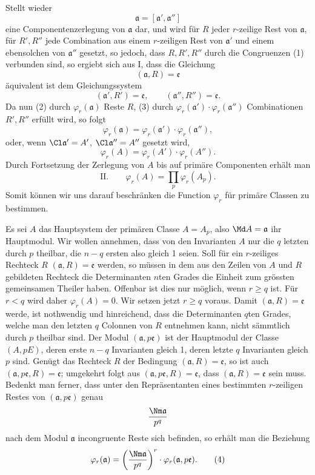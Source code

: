Stellt wieder
\[
 \mathfrak a=[\mathfrak a',\mathfrak a'']
\]
eine Componentenzerlegung von $\mathfrak a$ dar, und wird für $R$ jeder $r$-zeilige Rest von $\mathfrak a$, für $R',R''$ jede Combination aus einem $r$-zeiligen Rest von $\mathfrak a'$ und einem ebensolchen von $\mathfrak a''$ gesetzt, so jedoch, dass $R,R',R''$ durch die Congruenzen (1) verbunden sind, so ergiebt sich aus I, dass die Gleichung
\begin{equation}
 (\mathfrak a,R)=\mathfrak e
\tag{2}
\end{equation}
äquivalent ist dem Gleichungssystem
\begin{equation}
 (\mathfrak a',R')=\mathfrak e,
 \qquad
 (\mathfrak a'',R'')=\mathfrak e.
\tag{3}
\end{equation}
Da nun (2) durch $\varphi_r(\mathfrak a)$ Reste $R$, (3) durch $\varphi_r(\mathfrak a')\cdot\varphi_r(\mathfrak a'')$ Combinationen $R',R''$ erfüllt wird, so folgt
\[
 \varphi_r(\mathfrak a)=\varphi_r(\mathfrak a')\cdot\varphi_r(\mathfrak a''),
\]
oder, wenn $\Cl\mathfrak a'=A'$, $\Cl\mathfrak a''=A''$ gesetzt wird,
\[
 \varphi_r(A)=\varphi_r(A')\cdot\varphi_r(A'').
\]
Durch Fortsetzung der Zerlegung von $A$ bis auf primäre Componenten erhält man
\[
\text{II.}\qquad
 \varphi_r(A)=\prod_p \varphi_r(A_p).
\]
Somit können wir uns darauf beschränken die Function $\varphi_r$ für primäre Classen zu bestimmen.

Es sei $A$ das Hauptsystem der primären Classe $A=A_p$, also $\Md A=\mathfrak a$ ihr Hauptmodul. Wir wollen annehmen, dass von den Invarianten $A$ nur die $q$ letzten durch $p$ theilbar, die $n-q$ ersten also gleich 1 seien. Soll für ein $r$-zeiliges Rechteck $R$ $(\mathfrak a,R)=\mathfrak e$ werden, so müssen in dem aus den Zeilen von $A$ und $R$ gebildeten Rechteck die Determinanten $n$ten Grades die Einheit zum grössten gemeinsamen Theiler haben. Offenbar ist dies nur möglich, wenn $r\ge q$ ist. Für $r<q$ wird daher $\varphi_r(A)=0$. Wir setzen jetzt $r\ge q$ voraus. Damit $(\mathfrak a,R)=\mathfrak e$ werde, ist nothwendig und hinreichend, dass die Determinanten $q$ten Grades, welche man den letzten $q$ Colonnen von $R$ entnehmen kann, nicht sämmtlich durch $p$ theilbar sind. Der Modul $(\mathfrak a,p\mathfrak e)$ ist der Hauptmodul der Classe $(A,pE)$, deren erste $n-q$ Invarianten gleich 1, deren letzte $q$ Invarianten gleich $p$ sind. Genügt das Rechteck $R$ der Bedingung $(\mathfrak a,R)=\mathfrak e$, so ist auch $(\mathfrak a,p\mathfrak e,R)=\mathfrak e$; umgekehrt folgt aus $(\mathfrak a,p\mathfrak e,R)=\mathfrak e$, dass $(\mathfrak a,R)=\mathfrak e$ sein muss. Bedenkt man ferner, dass unter den Repräsentanten eines bestimmten $r$-zeiligen Restes von $(\mathfrak a,p\mathfrak e)$ genau
\[
 {\Nm\mathfrak a\over p^q}
\]
nach dem Modul $\mathfrak a$ incongruente Reste sich befinden, so erhält man die Beziehung
\begin{equation}
 \varphi_r(\mathfrak a)=\left({\Nm\mathfrak a\over p^q}\right)^r\cdot \varphi_r(\mathfrak a,p\mathfrak e).
\tag{4}
\end{equation}

